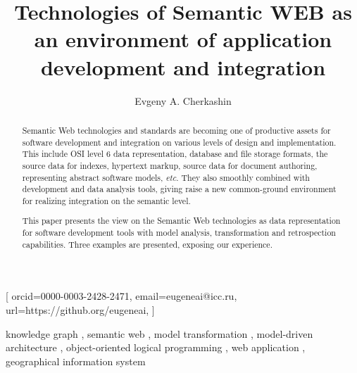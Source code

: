 \documentclass[
]{ceurart}
\begin{document}


\title{Technologies of Semantic WEB as an environment of application development and integration}
\author[1,2]{Evgeny A. Cherkashin}[%
orcid=0000-0003-2428-2471,
email=eugeneai@icc.ru,
url=https://github.org/eugeneai,
]
\address[1]{Matrosov Institute for System Dynamics and Control Theory of Siberian Branch of Russian Academy of Sciences, 134 Lermontov St, Irkutsk, 664033, Russian Federation}

\address[2]{Institute for Mathematics and Information Technologies, Irkutsk State University, 20~Gagarina Bulv, Irkutsk, 664003, Russian Federation}

\begin{abstract}
  Semantic Web technologies and standards are becoming one of productive assets for software development and integration on various levels of design and implementation.  This include OSI level 6 data representation, database and file storage formats, the source data for indexes, hypertext markup, source data for document authoring, representing abstract software models, \emph{etc}.  They also smoothly combined with development and data analysis tools, giving raise a new common-ground environment for realizing integration on the semantic level.

  This paper presents the view on the Semantic Web technologies as data representation for software development tools with model analysis, transformation and retrospection capabilities.  Three examples are presented, exposing our experience.
\end{abstract}

\begin{keywords}
  knowledge graph \sep
  semantic web \sep
  model transformation \sep
  model-driven architecture \sep
  object-oriented logical programming \sep
  web application \sep
  geographical information system
\end{keywords}
\end{document}
